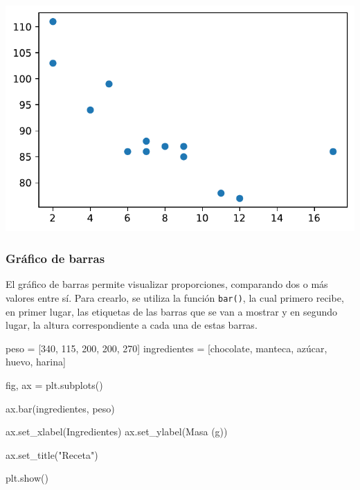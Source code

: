 \documentclass[
  letterpaper,
  DIV=11,
  numbers=noendperiod]{scrreprt}
\newenvironment{Shaded}{\begin{snugshade}}{\end{snugshade}}
\newcommand{\DecValTok}[1]{\textcolor[rgb]{0.68,0.00,0.00}{#1}}
\newcommand{\NormalTok}[1]{\textcolor[rgb]{0.00,0.23,0.31}{#1}}
\newcommand{\OperatorTok}[1]{\textcolor[rgb]{0.37,0.37,0.37}{#1}}
\newcommand{\StringTok}[1]{\textcolor[rgb]{0.13,0.47,0.30}{#1}}
\begin{document}
\includegraphics{unidad_6_files/figure-pdf/cell-118-output-1.pdf}

\subsubsection{Gráfico de barras}\label{gruxe1fico-de-barras}

El gráfico de barras permite visualizar proporciones, comparando dos o
más valores entre sí. Para crearlo, se utiliza la función
\texttt{bar()}, la cual primero recibe, en primer lugar, las etiquetas
de las barras que se van a mostrar y en segundo lugar, la altura
correspondiente a cada una de estas barras.

\begin{Shaded}
\begin{Highlighting}[]
\NormalTok{peso }\OperatorTok{=}\NormalTok{ [}\DecValTok{340}\NormalTok{, }\DecValTok{115}\NormalTok{, }\DecValTok{200}\NormalTok{, }\DecValTok{200}\NormalTok{, }\DecValTok{270}\NormalTok{]}
\NormalTok{ingredientes }\OperatorTok{=}\NormalTok{ [}\StringTok{\textquotesingle{}chocolate\textquotesingle{}}\NormalTok{, }\StringTok{\textquotesingle{}manteca\textquotesingle{}}\NormalTok{, }\StringTok{\textquotesingle{}azúcar\textquotesingle{}}\NormalTok{, }\StringTok{\textquotesingle{}huevo\textquotesingle{}}\NormalTok{, }\StringTok{\textquotesingle{}harina\textquotesingle{}}\NormalTok{]}

\NormalTok{fig, ax }\OperatorTok{=}\NormalTok{ plt.subplots()}

\NormalTok{ax.bar(ingredientes, peso)}

\NormalTok{ax.set\_xlabel(}\StringTok{\textquotesingle{}Ingredientes\textquotesingle{}}\NormalTok{)}
\NormalTok{ax.set\_ylabel(}\StringTok{\textquotesingle{}Masa (g)\textquotesingle{}}\NormalTok{)}

\NormalTok{ax.set\_title(}\StringTok{"Receta"}\NormalTok{)}

\NormalTok{plt.show()}
\end{Highlighting}
\end{Shaded}
\end{document}
